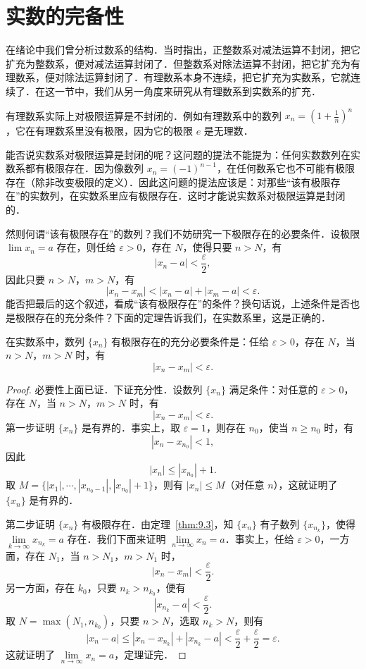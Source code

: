 \section{实数的完备性}

在绪论中我们曾分析过数系的结构．当时指出，正整数系对减法运算不封闭，把它扩充为整数系，便对减法运算封闭了．但整数系对除法运算不封闭，把它扩充为有理数系，便对除法运算封闭了．有理数系本身不连续，把它扩充为实数系，它就连续了．在这一节中，我们从另一角度来研究从有理数系到实数系的扩充．

有理数系实际上对极限运算是不封闭的．例如有理数系中的数列 $x_n = \left( 1 + \frac{1}{n} \right)^n$，它在有理数系里没有极限，因为它的极限 $e$ 是无理数．

能否说实数系对极限运算是封闭的呢？这问题的提法不能提为：任何实数数列在实数系都有极限存在．因为像数列 $x_n = (-1)^{n-1}$，在任何数系它也不可能有极限存在（除非改变极限的定义）．因此这问题的提法应该是：对那些“该有极限存在”的实数列，在实数系里应有极限存在．这时才能说实数系对极限运算是封闭的．

然则何谓“该有极限存在”的数列？我们不妨研究一下极限存在的必要条件．设极限 $\lim x_n = a$ 存在，则任给 $\varepsilon > 0$，存在 $N$，使得只要 $n > N$，有
\[
|x_n - a| < \frac{\varepsilon}{2},
\]
因此只要 $n > N$，$m > N$，有
\[
|x_n - x_m| < |x_n - a| + |x_m - a| < \varepsilon.
\]
能否把最后的这个叙述，看成“该有极限存在”的条件？换句话说，上述条件是否也是极限存在的充分条件？下面的定理告诉我们，在实数系里，这是正确的．

\begin{theorem}[柯西收敛原理]\label{thm:9.4}
在实数系中，数列 $\{x_n\}$ 有极限存在的充分必要条件是：任给 $\varepsilon > 0$，存在 $N$，当 $n > N$，$m > N$ 时，有
\[
|x_n - x_m| < \varepsilon.
\]
\end{theorem}

\begin{proof}
必要性上面已证．下证充分性．设数列 $\{x_n\}$ 满足条件：对任意的 $\varepsilon > 0$，存在 $N$，当 $n > N$，$m > N$ 时，有
\[
|x_n - x_m| < \varepsilon.
\]
第一步证明 $\{x_n\}$ 是有界的．事实上，取 $\varepsilon = 1$，则存在 $n_0$，使当 $n \geqslant n_0$ 时，有
\[
|x_n - x_{n_0}| < 1,
\]
因此
\[
|x_n| \leqslant |x_{n_0}| + 1.
\]
取 $M = \{|x_1|, \cdots, |x_{n_0-1}|, |x_{n_0}| + 1\}$，则有 $|x_n| \leqslant M$（对任意 $n$），这就证明了 $\{x_n\}$ 是有界的．

第二步证明 $\{x_n\}$ 有极限存在．由定理~\ref{thm:9.3}，知 $\{x_n\}$ 有子数列 $\{x_{n_k}\}$，使得 $\lim\limits_{k \to \infty} x_{n_k} = a$ 存在．我们下面来证明 $\lim\limits_{n \to \infty} x_n = a$．事实上，任给 $\varepsilon > 0$，一方面，存在 $N_1$，当 $n > N_1$，$m > N_1$ 时，
\[
|x_n - x_m| < \frac{\varepsilon}{2}.
\]
另一方面，存在 $k_0$，只要 $n_k > n_{k_0}$，便有
\[
|x_{n_k} - a| < \frac{\varepsilon}{2}.
\]
取 $N = \max(N_1, n_{k_0})$，只要 $n > N$，选取 $n_k > N$，则有
\[
|x_n - a| \leqslant |x_n - x_{n_k}| + |x_{n_k} - a| < \frac{\varepsilon}{2} + \frac{\varepsilon}{2} = \varepsilon.
\]
这就证明了 $\lim\limits_{n \to \infty} x_n = a$，定理证完．
\end{proof}

